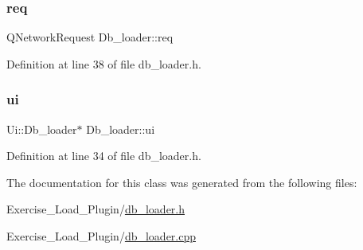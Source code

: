 \subsubsection{\texorpdfstring{req}{req}}
{\footnotesize\ttfamily Q\+Network\+Request Db\+\_\+loader\+::req\hspace{0.3cm}{\ttfamily [private]}}



Definition at line 38 of file db\+\_\+loader.\+h.

\mbox{\label{classDb__loader_a7bc8f5be142eb2ad90de8682268224ae}} 
\subsubsection{\texorpdfstring{ui}{ui}}
{\footnotesize\ttfamily Ui\+::\+Db\+\_\+loader$\ast$ Db\+\_\+loader\+::ui\hspace{0.3cm}{\ttfamily [private]}}



Definition at line 34 of file db\+\_\+loader.\+h.



The documentation for this class was generated from the following files\+:\begin{DoxyCompactItemize}
\item 
Exercise\+\_\+\+Load\+\_\+\+Plugin/\hyperlink{db__loader_8h}{db\+\_\+loader.\+h}\item 
Exercise\+\_\+\+Load\+\_\+\+Plugin/\hyperlink{db__loader_8cpp}{db\+\_\+loader.\+cpp}\end{DoxyCompactItemize}
